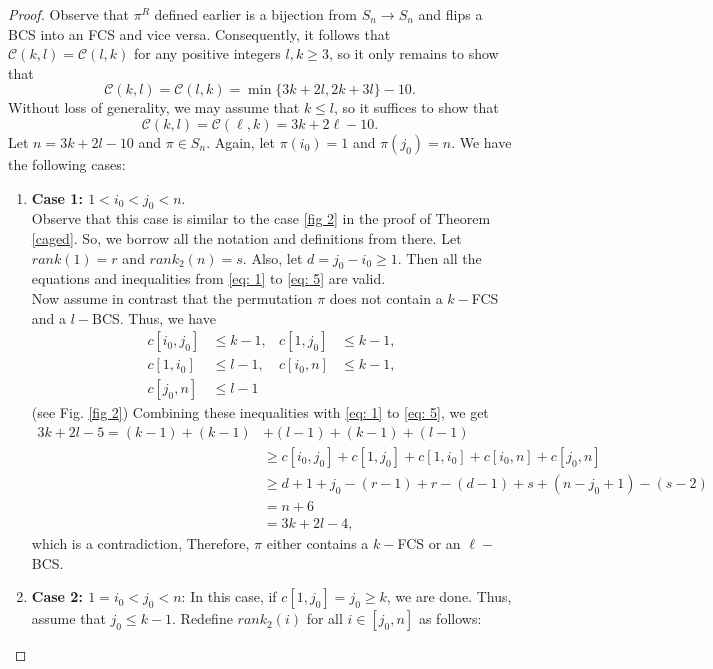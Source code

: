\documentclass[11pt, a4paper]{article}
\theoremstyle{compact}
\begin{document}
\begin{proof}
    Observe that $\pi^R$ defined earlier is a bijection from $S_n \longrightarrow S_n$ and flips a BCS into an FCS and vice versa. Consequently, it follows that $\mathcal{C}(k,l) = \mathcal{C}(l,k)$ for any positive integers $l,k \geq 3$, so it only remains to show that
    $$\mathcal{C}(k,l) =\mathcal{C}(l,k)=\min \{3k + 2l, 2k + 3l\} - 10.$$ 
    Without loss of generality, we may assume that $k \leq l$, so it suffices to show that 
    \[
     \mathcal{C}(k,l) = \mathcal{C}(\ell,k)  = 3k + 2\ell- 10.
    \]
    Let  $n = 3k + 2l - 10$ and $\pi \in S_n$. Again, let $\pi(i_0) = 1$ and $\pi(j_0) = n$. We have the following cases:
    \begin{enumerate}
   \item  \textbf{Case 1: $1<i_0 < j_0 < n$}. \\
    Observe that this case is similar to the case \ref{fig 2} in the proof of Theorem \ref{caged}. So, we borrow all the notation and definitions from there. Let $rank(1)=r$ and $rank_2(n)=s$. Also, let $d = j_0 - i_0 \geq 1$. Then all the equations and inequalities from \ref{eq: 1} to \ref{eq: 5} are valid. \\
    Now assume in contrast that the permutation $\pi$ does not contain a $k-$FCS and a $l-$BCS. Thus, we have
    \begin{align*}
        c[i_0, j_0] & \leq k-1, & c[1, j_0] & \leq k-1, \\
        c[1, i_0] & \leq l-1, &  c[i_0, n] & \leq k -1, \\
        c[j_0, n] & \leq l-1
    \end{align*} (see Fig. \ref{fig 2})
    Combining these inequalities with \ref{eq: 1} to \ref{eq: 5}, we get
    \begin{align*}
        3k + 2l -5 =  (k-1) +  (k-1) & + (l-1)  + (k-1) + (l-1) \\
         & \geq c[i_0, j_0] +  c[1, j_0] +  c[1, i_0] +   c[i_0,n] + c[j_0, n] \\
        & \geq  d + 1 + j_0 - (r-1) + r-(d-1) + s + (n-j_0+1) - (s-2) \\
        & = n + 6 \\
        & =  3k + 2l - 4,
    \end{align*} which is a contradiction, Therefore, $\pi$ either contains a $k-$FCS or an $\ell-$BCS.
    \item \textbf{Case 2: $1=i_0 < j_0 < n$}:
     In this case, if $c[1, j_0] = j_0 \geq k $, we are done. Thus, assume that $j_0 \leq k-1$. Redefine $rank_2(i)$ for all $i \in [j_0,n] $ as follows:

\end{enumerate}
\end{proof}
\end{document}
